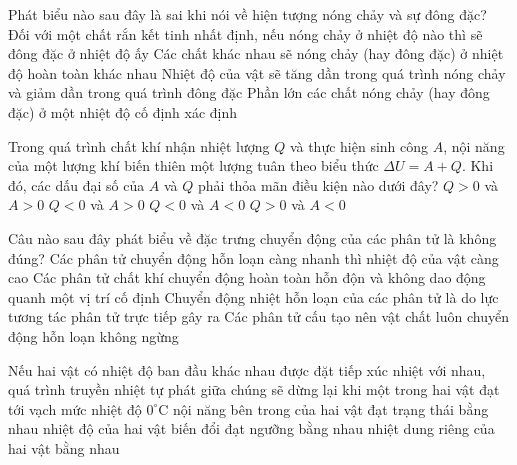 \begin{ex}	Phát biểu nào sau đây là sai khi nói về hiện tượng nóng chảy và sự đông đặc?
	\choice
	{Đối với một chất rắn kết tinh nhất định, nếu nóng chảy ở nhiệt độ nào thì sẽ đông đặc ở nhiệt độ ấy}
	{Các chất khác nhau sẽ nóng chảy (hay đông đặc) ở nhiệt độ hoàn toàn khác nhau}
	{\True Nhiệt độ của vật sẽ tăng dần trong quá trình nóng chảy và giảm dần trong quá trình đông đặc}
	{Phần lớn các chất nóng chảy (hay đông đặc) ở một nhiệt độ cố định xác định}
\end{ex}

\begin{ex}	Trong quá trình chất khí nhận nhiệt lượng $Q$ và thực hiện sinh công $A$, nội năng của một lượng khí biến thiên một lượng tuân theo biểu thức $\Delta U = A + Q$. Khi đó, các dấu đại số của $A$ và $Q$ phải thỏa mãn điều kiện nào dưới đây?
	\choice
	{$Q>0$ và $A>0$}
	{ $Q<0$ và $A>0$}
	{$Q<0$ và $A<0$}
	{\True $Q>0$ và $A<0$}
\end{ex}

\begin{ex}	Câu nào sau đây phát biểu về đặc trưng chuyển động của các phân tử là không đúng?
	\choice
	{Các phân tử chuyển động hỗn loạn càng nhanh thì nhiệt độ của vật càng cao}
	{Các phân tử chất khí chuyển động hoàn toàn hỗn độn và không dao động quanh một vị trí cố định}
	{\True Chuyển động nhiệt hỗn loạn của các phân tử là do lực tương tác phân tử trực tiếp gây ra}
	{Các phân tử cấu tạo nên vật chất luôn chuyển động hỗn loạn không ngừng}
\end{ex}

\begin{ex}	Nếu hai vật có nhiệt độ ban đầu khác nhau được đặt tiếp xúc nhiệt với nhau, quá trình truyền nhiệt tự phát giữa chúng sẽ dừng lại khi
	\choice
	{một trong hai vật đạt tới vạch mức nhiệt độ $0^\circ\text{C}$}
	{nội năng bên trong của hai vật đạt trạng thái bằng nhau}
	{\True nhiệt độ của hai vật biến đổi đạt ngưỡng bằng nhau}
	{nhiệt dung riêng của hai vật bằng nhau}
\end{ex}

